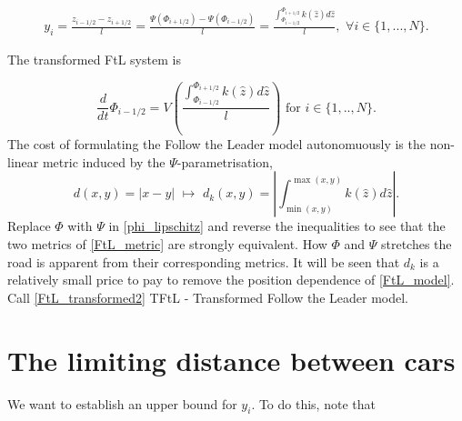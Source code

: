 \begin{align}
    y_i = \frac{z_{i-1/2} - z_{i+1/2}}{l} 
     = \frac{\Psi(\Phi_{i+1/2}) - \Psi(\Phi_{i-1/2})}{l}
     = \frac{\int_{\Phi_{i-1/2}}^{\Phi_{i+1/2}} k(\hat{z}) d \hat{z}}{l}, \, \, \forall i \in \{1,...,N\}.
\end{align}

The transformed FtL system is 

\begin{equation}\label{FtL_transformed2}  
   \frac{d}{dt} \Phi_{i-1/2}  = V\left(\frac{\int_{\Phi_{i-1/2}}^{\Phi_{i+1/2}} k(\hat{z}) d \hat{z}}{l}\right) \text{ for } i \in \{1,..,N\}.
\end{equation}
The cost of formulating the Follow the Leader model autonomuously is the non-linear metric induced by the $\Psi$-parametrisation, 
\begin{equation} \label{FtL_metric}
    d(x,y) = \left| x - y\right| \, \, \mapsto \, \, d_k(x,y) = \left|\int_{\min(x,y)}^{\max(x,y)} k(\hat{z}) d \hat{z}\right|.
\end{equation}
Replace $\Phi$ with $\Psi$ in \eqref{phi_lipschitz} and reverse the inequalities to see that the two metrics of \eqref{FtL_metric} are strongly equivalent. How $\Phi$ and $\Psi$ stretches the road is apparent from their corresponding metrics. It will be seen that $d_k$ is a relatively small price to pay to remove the position dependence of \eqref{FtL_model}. Call \ref{FtL_transformed2} TFtL - Transformed Follow the Leader model. 

\section{The limiting distance between cars} \label{section:distance_cars}
We want to establish an upper bound for $y_i$. To do this, note that 

